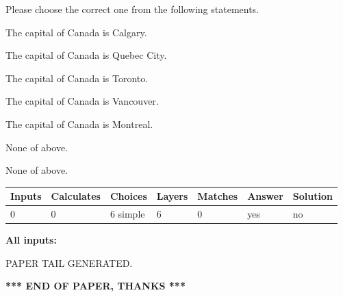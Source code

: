 \documentclass[12pt]{article}
\begin{document}
  
Please choose the correct one from the following statements.
 
 
The capital of Canada is Calgary.
 
 
The capital of Canada is Quebec City.
 
 
The capital of Canada is Toronto.
 
 
The capital of Canada is Vancouver.
 
 
The capital of Canada is Montreal.
 
 
 None of above.
 
 
\noindent{}
 
 
 None of above.
 
 
\noindent{}
 
 
   
   
   
   
\noindent\begin{tabular}{|l|l|l|l|l|l|l|}
 \hline
Inputs & Calculates & Choices & Layers & Matches & Answer & Solution \\ \hline
 0  & 
 0  & 
 6
  simple  
  & 
 6  & 
 0  & 
  yes & 
  no 
  \\ \hline
 \end{tabular}
   
   
   
   
\noindent{}
   
   
   
   
\noindent\vspace{0.1in}\hspace{-0.08in} {\textbf{\Large{All inputs: }}}
   
   
   
   
   
   
 \vspace{0.2in}
 
   
   
\vspace{2.0in} PAPER TAIL GENERATED.
   
   
   
   
\vspace{1.0in} 
{\textbf{\large{ *** END OF PAPER, THANKS *** }}} 
   
\end{document}
